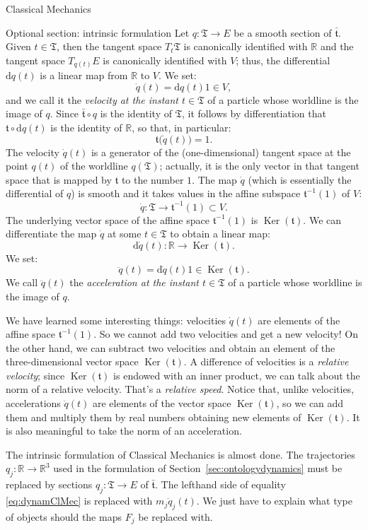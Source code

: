 \documentclass[oneside,a4paper,11pt]{amsbook}
\newcommand{\R}{\mathds R}
\newcommand{\dd}{\mathrm d}
\DeclareMathOperator{\Ker}{Ker}
\theoremstyle{remark}\newtheorem{exercise}{Exercise}[chapter]
\theoremstyle{plain}\newtheorem{teo}{Theorem}[section]
\theoremstyle{plain}\newtheorem{lem}[teo]{Lemma}
\theoremstyle{plain}\newtheorem{prop}[teo]{Proposition}
\theoremstyle{plain}\newtheorem{cor}[teo]{Corollary}
\theoremstyle{definition}\newtheorem{defin}[teo]{Definition}
\theoremstyle{remark}\newtheorem{rem}[teo]{Remark}
\theoremstyle{definition}\newtheorem{notation}[teo]{Notation}
\theoremstyle{definition}\newtheorem{convention}[teo]{Convention}
\theoremstyle{definition}\newtheorem{example}[teo]{Example}
\numberwithin{section}{chapter}
\numberwithin{equation}{section}
\begin{document}
\begin{chapter}{Classical Mechanics}
\begin{section}{Optional section: intrinsic formulation}
Let $q:\mathfrak T\to E$ be a smooth section of $\bar{\mathfrak t}$.
Given $t\in\mathfrak T$, then the tangent space $T_t\mathfrak T$ is canonically identified with $\R$ and the tangent
space $T_{q(t)}E$ is canonically identified with $V$; thus, the differential $\dd q(t)$ is a linear map from $\R$
to $V$. We set:
\[\dot q(t)=\dd q(t)1\in V,\]
and we call it the {\em velocity at the instant $t\in\mathfrak T$\/} of a particle whose worldline is the image of $q$.
Since $\bar{\mathfrak t}\circ q$ is the identity of $\mathfrak T$, it follows by differentiation that $\mathfrak t\circ\dd q(t)$
is the identity of $\R$, so that, in particular:
\[\mathfrak t\big(\dot q(t)\big)=1.\]
The velocity $\dot q(t)$ is a generator of the (one-dimensional) tangent space at the point $q(t)$
of the worldline $q(\mathfrak T)$; actually, it is the only vector in that tangent space that is mapped by $\mathfrak t$ to the number $1$.
The map $\dot q$ (which is essentially the differential of $q$) is smooth and it takes values in the affine subspace
$\mathfrak t^{-1}(1)$ of $V$:
\[\dot q:\mathfrak T\longrightarrow\mathfrak t^{-1}(1)\subset V.\]
The underlying vector space of the affine space $\mathfrak t^{-1}(1)$ is $\Ker(\mathfrak t)$.
We can differentiate the map $\dot q$ at some $t\in\mathfrak T$ to obtain a linear map:
\[\dd\dot q(t):\R\longrightarrow\Ker(\mathfrak t).\]
We set:
\[\ddot q(t)=\dd\dot q(t)1\in\Ker(\mathfrak t).\]
We call $\ddot q(t)$ the {\em acceleration at the instant $t\in\mathfrak T$\/} of a particle whose
worldline is the image of $q$.

We have learned some interesting things: velocities $\dot q(t)$ are elements of the affine space $\mathfrak t^{-1}(1)$.
So we cannot add two velocities and get a new velocity! On the other hand, we can subtract two velocities and obtain
an element of the three-dimensional vector space $\Ker(\mathfrak t)$. A difference of velocities is a {\em relative velocity}; since
$\Ker(\mathfrak t)$ is endowed with an inner product, we can talk about the norm of a relative velocity. That's
a {\em relative speed}. Notice that, unlike velocities, accelerations $\ddot q(t)$ are elements of the vector space
$\Ker(\mathfrak t)$, so we can add them and multiply them by real numbers obtaining new elements of $\Ker(\mathfrak t)$.
It is also meaningful to take the norm of an acceleration.

The intrinsic formulation of Classical Mechanics is almost done. The trajectories $q_j:\R\to\R^3$ used
in the formulation of Section~\ref{sec:ontologydynamics} must be replaced
by sections $q_j:\mathfrak T\to E$ of $\bar{\mathfrak t}$. The lefthand side of equality \eqref{eq:dynamClMec}
is replaced with $m_j\ddot q_j(t)$. We just have to explain what type of objects should the maps $F_j$ be
replaced with.


\end{section}
\end{chapter}
\end{document}
